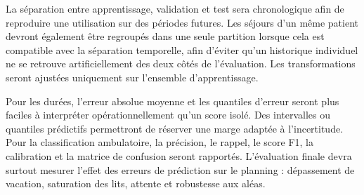 La séparation entre apprentissage, validation et test sera chronologique afin de reproduire une utilisation sur des périodes futures. Les séjours d'un même patient devront également être regroupés dans une seule partition lorsque cela est compatible avec la séparation temporelle, afin d'éviter qu'un historique individuel ne se retrouve artificiellement des deux côtés de l'évaluation. Les transformations seront ajustées uniquement sur l'ensemble d'apprentissage.

Pour les durées, l'erreur absolue moyenne et les quantiles d'erreur seront plus faciles à interpréter opérationnellement qu'un score isolé. Des intervalles ou quantiles prédictifs permettront de réserver une marge adaptée à l'incertitude. Pour la classification ambulatoire, la précision, le rappel, le score F1, la calibration et la matrice de confusion seront rapportés. L'évaluation finale devra surtout mesurer l'effet des erreurs de prédiction sur le planning : dépassement de vacation, saturation des lits, attente et robustesse aux aléas.

